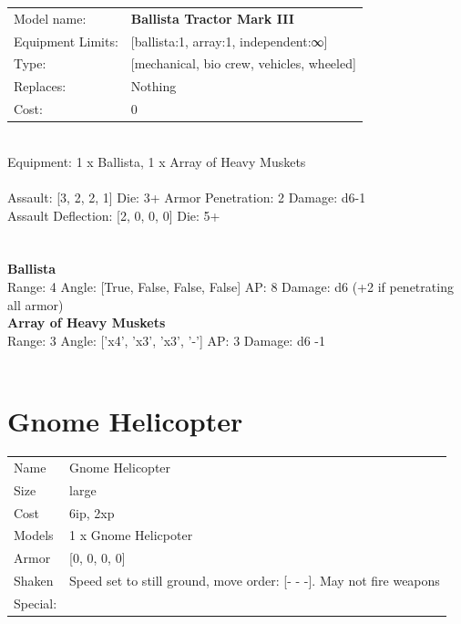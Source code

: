 \noindent
\begin{tabular}{ll}
Model name: &{\bf Ballista Tractor Mark III } \\
Equipment Limits: &[ballista:1, array:1, independent:∞] \\
Type: &[mechanical, bio crew, vehicles, wheeled] \\
Replaces: &Nothing \\
Cost: & 0\\
\end{tabular}
\ \\
Equipment: 1 x Ballista, 1 x Array of Heavy Muskets \\
\ \\
Assault: [3, 2, 2, 1] Die: 3+ Armor Penetration: 2 Damage: d6-1 \\
Assault Deflection: [2, 0, 0, 0] Die: 5+\\
\indent  
\ \\

\ \\
{\bf Ballista } \\



Range: 4  Angle: [True, False, False, False] AP: 8 Damage: d6 (+2 if penetrating all armor) \\




{\bf Array of Heavy Muskets } \\



Range: 3  Angle: ['x4', 'x3', 'x3', '-'] AP: 3 Damage: d6 -1 \\




 
\ \\













\clearpage

\section{ Gnome Helicopter }

\begin{tabular}{ll}
  Name & Gnome Helicopter \\
  Size & large\\
  Cost & 6ip, 2xp\\
  Models & 1 x Gnome Helicpoter\\
  Armor & [0, 0, 0, 0]\\
  Shaken & Speed set to still ground, move order: [- - -]. May not fire weapons\\
  Special: \\
\end{tabular}

